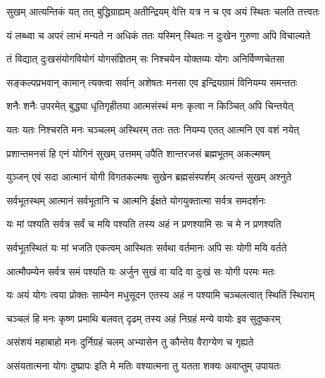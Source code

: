 \twolineshloka
{सुखम् आत्यन्तिकं यत् तत् बुद्धिग्राह्यम् अतीन्द्रियम्}
{वेत्ति यत्र न च एव अयं स्थितः चलति तत्त्वतः}%

\twolineshloka
{यं लब्ध्वा च अपरं लाभं मन्यते न अधिकं ततः}
{यस्मिन् स्थितः न दुःखेन गुरुणा अपि विचाल्यते}%

\twolineshloka
{तं विद्यात् दुःखसंयोगवियोगं योगसंज्ञितम्}
{सः निश्चयेन योक्तव्यः योगः अनिर्विण्णचेतसा}%

\twolineshloka
{सङ्कल्पप्रभवान् कामान् त्यक्त्वा सर्वान् अशेषतः}
{मनसा एव इन्द्रियग्रामं विनियम्य समन्ततः}%

\twolineshloka
{शनैः शनैः उपरमेत् बुद्ध्या धृतिगृहीतया}
{आत्मसंस्थं मनः कृत्वा न किञ्चित् अपि चिन्तयेत्}%

\twolineshloka
{यतः यतः निश्चरति मनः चञ्चलम् अस्थिरम्}
{ततः ततः नियम्य एतत् आत्मनि एव वशं नयेत्}%

\twolineshloka
{प्रशान्तमनसं हि एनं योगिनं सुखम् उत्तमम्}
{उपैति शान्तरजसं ब्रह्मभूतम् अकल्मषम्}%

\twolineshloka
{युञ्जन् एवं सदा आत्मानं योगी विगतकल्मषः}
{सुखेन ब्रह्मसंस्पर्शम् अत्यन्तं सुखम् अश्नुते}%

\twolineshloka
{सर्वभूतस्थम् आत्मानं सर्वभूतानि च आत्मनि}
{ईक्षते योगयुक्तात्मा सर्वत्र समदर्शनः}%

\twolineshloka
{यः मां पश्यति सर्वत्र सर्वं च मयि पश्यति}
{तस्य अहं न प्रणश्यामि सः च मे न प्रणश्यति}%

\twolineshloka
{सर्वभूतस्थितं यः मां भजति एकत्वम् आस्थितः}
{सर्वथा वर्तमानः अपि सः योगी मयि वर्तते}%

\twolineshloka
{आत्मौपम्येन सर्वत्र समं पश्यति यः अर्जुन}
{सुखं वा यदि वा दुःखं सः योगी परमः मतः}%


\twolineshloka
{यः अयं योगः त्वया प्रोक्तः साम्येन मधुसूदन}
{एतस्य अहं न पश्यामि चञ्चलत्वात् स्थितिं स्थिराम्}%

\twolineshloka
{चञ्चलं हि मनः कृष्ण प्रमाथि बलवत् दृढम्}
{तस्य अहं निग्रहं मन्ये वायोः इव सुदुष्करम्}%


\twolineshloka
{असंशयं महाबाहो मनः दुर्निग्रहं चलम्}
{अभ्यासेन तु कौन्तेय वैराग्येण च गृह्यते}%

\twolineshloka
{असंयतात्मना योगः दुष्प्रापः इति मे मतिः}
{वश्यात्मना तु यतता शक्यः अवाप्तुम् उपायतः}%


